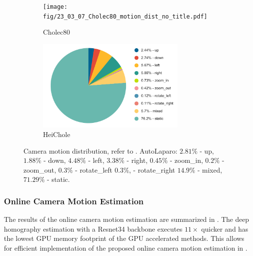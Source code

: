 \begin{figure}
    \centering
    \begin{subfigure}[b]{\textwidth}
        \centering
        \texttt{[image: fig/23\_03\_07\_Cholec80\_motion\_dist\_no\_title.pdf]}
        \caption{Cholec80}
    \end{subfigure}
    \hfill
    \centering
    \begin{subfigure}[b]{\textwidth}
        \centering
        \includegraphics[width=0.8\textwidth]{fig/23_03_07_HeiChole_motion_dist_no_title.pdf}
        \caption{HeiChole}
    \end{subfigure}
    \caption{Camera motion distribution, refer to . AutoLaparo: $2.81\%$ - up, $1.88\%$ - down, $4.48\%$ - left, $3.38\%$ - right, $0.45\%$ - zoom\_in, $0.2\%$ - zoom\_out, $0.3\%$ - rotate\_left $0.3\%$, - rotate\_right $14.9\%$ - mixed, $71.29\%$ - static.}
    \label{c4:fig:camera_motion_distribution}
\end{figure}

\subsubsection{Online Camera Motion Estimation}
The results of the online camera motion estimation are summarized in . The deep homography estimation with a Resnet34 backbone executes $11\times$ quicker and has the lowest GPU memory footprint of the GPU accelerated methods. This allows for efficient implementation of the proposed online camera motion estimation in .

